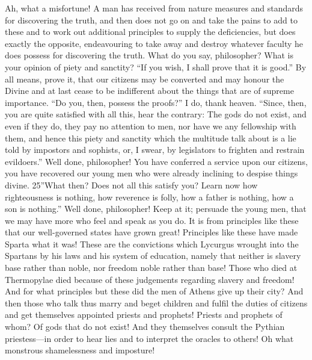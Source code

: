 Ah, what a misfortune! A man has received from nature measures and standards for discovering the truth, and then does not go on and take the pains to add to these and to work out additional principles to supply the deficiencies, but does exactly the opposite, endeavouring to take away and destroy whatever faculty he does possess for discovering the truth. What do you say, philosopher? What is your opinion of piety and sanctity? ``If you wish, I shall prove that it is good.'' By all means, prove it, that our citizens may be converted and may honour the Divine and at last cease to be indifferent about the things that are of supreme importance. ``Do you, then, possess the proofs?'' I do, thank heaven. ``Since, then, you are quite satisfied with all this, hear the contrary: The gods do not exist, and even if they do, they pay no attention to men, nor have we any fellowship with them, and hence this piety and sanctity which the multitude talk about is a lie told by impostors and sophists, or, I swear, by legislators to frighten and restrain evildoers.'' Well done, philosopher! You have conferred a service upon our citizens, you have recovered our young men who were already inclining to despise things divine. 25''What then? Does not all this satisfy you? Learn now how righteousness is nothing, how reverence is folly, how a father is nothing, how a son is nothing.'' Well done, philosopher! Keep at it; persuade the young men, that we may have more who feel and speak as you do. It is from principles like these that our well-governed states have grown great! Principles like these have made Sparta what it was! These are the convictions which Lycurgus wrought into the Spartans by his laws and his system of education, namely that neither is slavery base rather than noble, nor freedom noble rather than base! Those who died at Thermopylae died because of these judgements regarding slavery and freedom! And for what principles but these did the men of Athens give up their city? And then those who talk thus marry and beget children and fulfil the duties of citizens and get themselves appointed priests and prophets! Priests and prophets of whom? Of gods that do not exist! And they themselves consult the Pythian priestess—in order to hear lies and to interpret the oracles to others! Oh what monstrous shamelessness and imposture!

